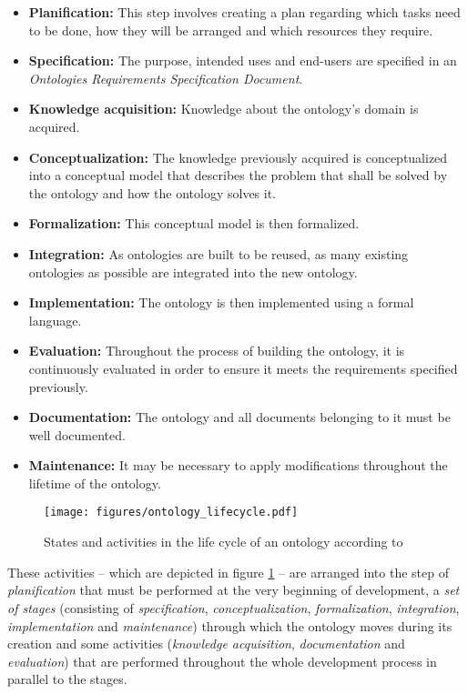 \begin{itemize}
  \item \textbf{Planification:} This step involves creating a plan regarding which tasks need to be done, how they will be arranged and which resources they require.
  \item \textbf{Specification:} The purpose, intended uses and end-users are specified in an \emph{Ontologies Requirements Specification Document}.
  \item \textbf{Knowledge acquisition:} Knowledge about the ontology's domain is acquired.
  \item \textbf{Conceptualization:} The knowledge previously acquired is conceptualized into a conceptual model that describes the problem that shall be solved by the ontology and how the ontology solves it.
  \item \textbf{Formalization:} This conceptual model is then formalized.
  \item \textbf{Integration:} As ontologies are built to be reused, as many existing ontologies as possible are integrated into the new ontology.
  \item \textbf{Implementation:} The ontology is then implemented using a formal language.
  \item \textbf{Evaluation:} Throughout the process of building the ontology, it is continuously evaluated in order to ensure it meets the requirements specified previously.
  \item \textbf{Documentation:} The ontology and all documents belonging to it must be well documented.
  \item \textbf{Maintenance:} It may be necessary to apply modifications throughout the lifetime of the ontology.
\end{itemize}

\begin{figure}
  \texttt{[image: figures/ontology\_lifecycle.pdf]}
  \caption{States and activities in the life cycle of an ontology according to \methontology \cite{Methontology}}
  \label{fig:methontology1}
\end{figure}

These activities -- which are depicted in figure \ref{fig:methontology1} -- are arranged into the step of \emph{planification} that must be performed at the very beginning of development, a \emph{set of stages} (consisting of \emph{specification}, \emph{conceptualization}, \emph{formalization}, \emph{integration}, \emph{implementation} and \emph{maintenance}) through which the ontology moves during its creation and some activities (\emph{knowledge acquisition}, \emph{documentation} and \emph{evaluation}) that are performed throughout the whole development process in parallel to the stages.

